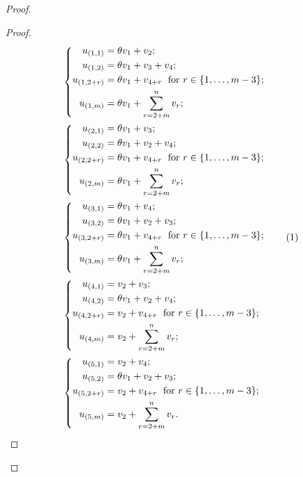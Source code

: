 \documentclass[a4paper,reqno,11pt]{amsart}
\theoremstyle{definition}
\theoremstyle{remark}
\numberwithin{equation}{section}
\begin{document}
\begin{proof}
\begin{proof}
\begingroup
\allowdisplaybreaks
\begin{align*}
& \left\{ 
\begin{aligned}
u_{(1,1)} & =\theta v_1+v_2;\\
u_{(1,2)} & =\theta v_1+v_3+v_4;\\
u_{(1,2+r)} & =\theta v_1+v_{4+r}\phantom{;} \text{ for } r \in \{1, \ldots, m-3\};\\
u_{(1,m)} & =\theta v_1 +\sum_{r=2+m}^{n}v_r;
\end{aligned}
\right. \\
& \left\{ 
\begin{aligned}
u_{(2,1)} & =\theta v_1+v_3;\\
u_{(2,2)} & =\theta v_1+v_2+v_4;\\
u_{(2,2+r)} & =\theta v_1+v_{4+r}\phantom{;} \text{ for } r \in \{1, \ldots, m-3\};\\
u_{(2,m)} & =\theta v_1 +\sum_{r=2+m}^{n}v_r;\\
\end{aligned}
\right. \\
& \left\{ 
\begin{aligned}
u_{(3,1)} & =\theta v_1+v_4;\\
u_{(3,2)} & =\theta v_1+v_2+v_3;\\
u_{(3,2+r)} & =\theta v_1+v_{4+r}\phantom{;} \text{ for } r \in \{1, \ldots, m-3\}; \\
u_{(3,m)} & =\theta v_1 +\sum_{r=2+m}^{n}v_r;
\end{aligned}
\right. \stepcounter{equation}\tag{\theequation} \label{orb}  \\
& \left\{ 
\begin{aligned}
u_{(4,1)} & =v_2+v_3;\\
u_{(4,2)} & =\theta v_1+v_2+v_4;\\
u_{(4,2+r)} & =v_2+v_{4+r}\phantom{;} \text{ for } r \in \{1, \ldots, m-3\};\\
u_{(4,m)} & =v_2 +\sum_{r=2+m}^{n}v_r;
\end{aligned}
\right. \\
& \left\{ 
\begin{aligned}
u_{(5,1)} & =v_2+v_4;\\
u_{(5,2)} & =\theta v_1+v_2+v_3;\\
u_{(5,2+r)} & =v_2+v_{4+r}\phantom{;} \text{ for } r \in \{1, \ldots, m-3\};\\
u_{(5,m)} & =v_2 +\sum_{r=2+m}^{n}v_r.
\end{aligned}
\right.  
\end{align*}
\endgroup


\end{proof}
\end{proof}
\end{document}
